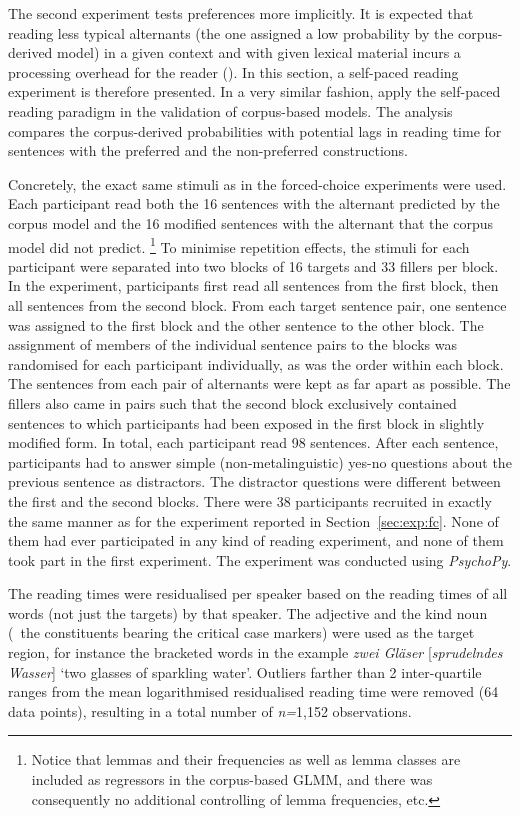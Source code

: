 The second experiment tests preferences more implicitly.
It is expected that reading less typical alternants (the one assigned a low probability by the corpus-derived model) in a given context and with given lexical material incurs a processing overhead for the reader (\citealp{Kaiser2013}).
In this section, a self-paced reading experiment is therefore presented.
In a very similar fashion, \cite{DivjakEa2016} apply the self-paced reading paradigm in the validation of corpus-based models.
The analysis compares the corpus-derived probabilities with potential lags in reading time for sentences with the preferred and the non-preferred constructions.

Concretely, the exact same stimuli as in the forced-choice experiments were used.
Each participant read both the 16 sentences with the alternant predicted by the corpus model and the 16 modified sentences with the alternant that the corpus model did not predict.%
\footnote{Notice that lemmas and their frequencies as well as lemma classes are included as regressors in the corpus-based GLMM, and there was consequently no additional controlling of lemma frequencies, etc.}
To minimise repetition effects, the stimuli for each participant were separated into two blocks of 16 targets and 33 fillers per block.
In the experiment, participants first read all sentences from the first block, then all sentences from the second block.
From each target sentence pair, one sentence was assigned to the first block and the other sentence to the other block.
The assignment of members of the individual sentence pairs to the blocks was randomised for each participant individually, as was the order within each block.
The sentences from each pair of alternants were kept as far apart as possible.
The fillers also came in pairs such that the second block exclusively contained sentences to which participants had been exposed in the first block in slightly modified form.
In total, each participant read 98 sentences.
After each sentence, participants had to answer simple (non-metalinguistic) yes-no questions about the previous sentence as distractors.
The distractor questions were different between the first and the second blocks.
There were 38 participants recruited in exactly the same manner as for the experiment reported in Section~\ref{sec:exp:fc}.
None of them had ever participated in any kind of reading experiment, and none of them took part in the first experiment.
The experiment was conducted using \textit{PsychoPy}.

The reading times were residualised per speaker based on the reading times of all words (not just the targets) by that speaker.
The adjective and the kind noun (\ie\ the constituents bearing the critical case markers) were used as the target region, for instance the bracketed words in the example \textit{zwei Gläser} [\textit{spru\-deln\-des Wasser}] `two glasses of sparkling water'.
Outliers farther than 2 inter-quartile ranges from the mean logarithmised residualised reading time were removed (64 data points), resulting in a total number of \textit{n=}1,152 observations.

